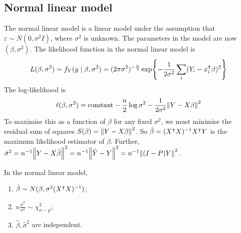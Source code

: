 \subsection{Normal linear model}
The normal linear model is a linear model under the assumption that \( \varepsilon \sim N(0,\sigma^2 I) \), where \( \sigma^2 \) is unknown.
The parameters in the model are now \( (\beta, \sigma^2) \).
The likelihood function in the normal linear model is
\[
	L(\beta, \sigma^2) = f_Y(y\mid \beta,\sigma^2) = (2\pi \sigma^2)^{-\frac{n}{2}} \exp{-\frac{1}{2\sigma^2} \sum_i (Y_i - x_i^\intercal\beta)^2}
\]
The log-likelihood is
\[
	\ell(\beta,\sigma^2) = \text{constant} - \frac{n}{2}\log \sigma^2 - \frac{1}{2\sigma^2} \norm{Y-X\beta}^2
\]
To maximise this as a function of \( \beta \) for any fixed \( \sigma^2 \), we must minimise the residual sum of squares \( S(\beta) = \norm{Y-X\beta}^2 \).
So \( \hat \beta = (X^\intercal X)^{-1} X^\intercal Y \) is the maximum likelihood estimator of \( \beta \).
Further, \( \hat \sigma^2 = n^{-1} \norm{Y-X\hat\beta}^2 = n^{-1} \norm{\hat Y - Y}^2 = n^{-1} \norm{(I-P)Y}^2 \).
\begin{theorem}
	In the normal linear model,
	\begin{enumerate}
		\item \( \hat \beta \sim N(\beta,\sigma^2(X^\intercal X)^{-1}) \);
		\item \( n\frac{\hat\sigma^2}{\sigma^2} \sim \chi^2_{n-p} \);
		\item \( \hat \beta, \hat \sigma^2 \) are independent.
	\end{enumerate}
\end{theorem}
